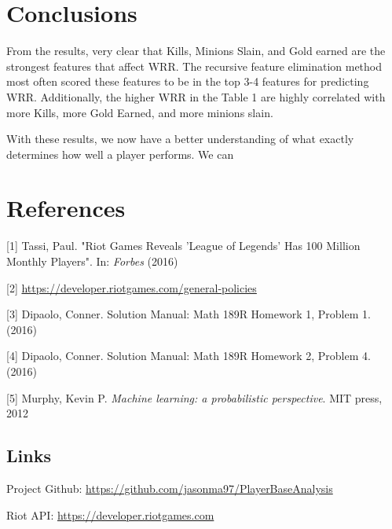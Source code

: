 \documentclass{article}
\begin{document}
	\section{Conclusions}
	From the results, very clear that Kills, Minions Slain, and Gold earned are the strongest features that affect WRR. The recursive feature elimination method most often scored these features to be in the top 3-4 features for predicting WRR. Additionally, the higher WRR in the Table 1 are highly correlated with more Kills, more Gold Earned, and more minions slain. 
	
	With these results, we now have a better understanding of what exactly determines how well a player performs. We can 
	
	\section{References}
	[1] Tassi, Paul.  "Riot Games Reveals 'League of Legends' Has 100 Million Monthly Players".  In: \textit{Forbes} (2016)
	
	[2] \url{https://developer.riotgames.com/general-policies}
	
	
	[3] Dipaolo, Conner. Solution Manual: Math 189R Homework 1, Problem 1. (2016)
	
	[4] Dipaolo, Conner. Solution Manual: Math 189R Homework 2, Problem 4. (2016) 
	
	[5] Murphy, Kevin P. \textit{Machine learning: a probabilistic perspective}. MIT press, 2012
	
	\subsection{Links}
	Project Github: \url{https://github.com/jasonma97/PlayerBaseAnalysis}
	
	Riot API: \url{https://developer.riotgames.com}
	
\end{document}
